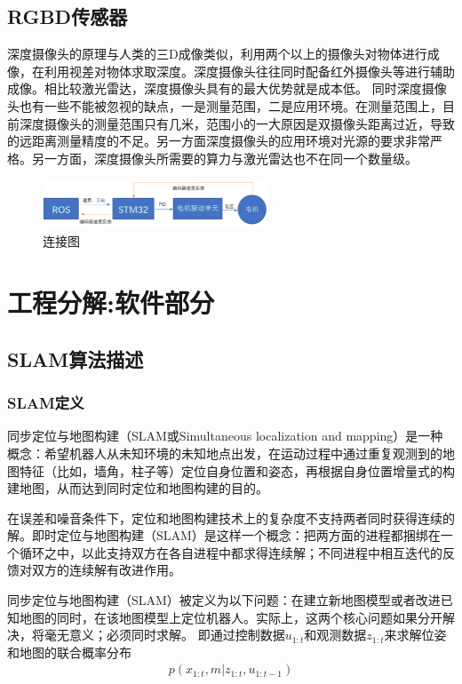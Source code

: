 \documentclass[cs4size,a4paper]{ctexart}
\numberwithin{equation}{section}
\numberwithin{table}{section}
\numberwithin{figure}{section}
\begin{document}
\subsection{RGBD传感器}
深度摄像头的原理与人类的三D成像类似，利用两个以上的摄像头对物体进行成像，在利用视差对物体求取深度。深度摄像头往往同时配备红外摄像头等进行辅助成像。相比较激光雷达，深度摄像头具有的最大优势就是成本低。
同时深度摄像头也有一些不能被忽视的缺点，一是测量范围，二是应用环境。在测量范围上，目前深度摄像头的测量范围只有几米，范围小的一大原因是双摄像头距离过近，导致的远距离测量精度的不足。另一方面深度摄像头的应用环境对光源的要求非常严格。另一方面，深度摄像头所需要的算力与激光雷达也不在同一个数量级。
\begin{figure}[H]
        \centering
        \includegraphics[width=0.6\textwidth]{figure/summary.png}
        \caption{连接图}
\end{figure}
\section{工程分解:软件部分}
\subsection{SLAM算法描述}
\subsubsection{SLAM定义}
同步定位与地图构建（SLAM或Simultaneous localization and mapping）是一种概念：希望机器人从未知环境的未知地点出发，在运动过程中通过重复观测到的地图特征（比如，墙角，柱子等）定位自身位置和姿态，再根据自身位置增量式的构建地图，从而达到同时定位和地图构建的目的。

在误差和噪音条件下，定位和地图构建技术上的复杂度不支持两者同时获得连续的解。即时定位与地图构建（SLAM）是这样一个概念：把两方面的进程都捆绑在一个循环之中，以此支持双方在各自进程中都求得连续解；不同进程中相互迭代的反馈对双方的连续解有改进作用。

同步定位与地图构建（SLAM）被定义为以下问题：在建立新地图模型或者改进已知地图的同时，在该地图模型上定位机器人。实际上，这两个核心问题如果分开解决，将毫无意义；必须同时求解。
即通过控制数据$u_{1:t}$和观测数据$z_{1:t}$来求解位姿和地图的联合概率分布
\begin{align}
    p\left(x_{1: t}, m | z_{1: t}, u_{1: t-1}\right)
\end{align}
\end{document}
